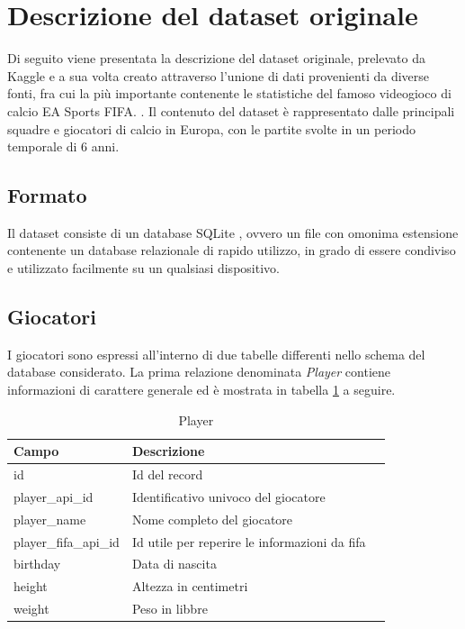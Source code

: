 \documentclass[hidelinks, 12pt]{article}
\begin{document}
\clearpage



\section{Descrizione del dataset originale}

Di seguito viene presentata la descrizione del dataset originale, prelevato da Kaggle \cite{site:kaggle-dataset} e a sua volta creato attraverso l'unione di dati provenienti da diverse fonti, fra cui la più importante contenente le statistiche del famoso videogioco di calcio EA Sports FIFA. \cite{site:ea-fifa}. Il contenuto del dataset è rappresentato dalle principali squadre e giocatori di calcio in Europa, con le partite svolte in un periodo temporale di 6 anni.



\subsection{Formato}

Il dataset consiste di un database SQLite \cite{site:sqlite}, ovvero un file con omonima estensione contenente un database relazionale di rapido utilizzo, in grado di essere condiviso e utilizzato facilmente su un qualsiasi dispositivo.



\subsection{Giocatori}

I giocatori sono espressi all'interno di due tabelle differenti nello schema del database considerato. La prima relazione denominata {\it Player} contiene informazioni di carattere generale ed è mostrata in tabella \ref{tab:player} a seguire.

\begin{table}[H]
	\caption{Player}\label{tab:player}
	\centering
	\begin{tabular}{|l|l|l|}
		\hline
		Campo & Descrizione \\
		\hline
		id & Id del record \\
		player\_api\_id & Identificativo univoco del giocatore \\
		player\_name & Nome completo del giocatore \\
		player\_fifa\_api\_id & Id utile per reperire le informazioni da fifa \\
		birthday & Data di nascita \\
		height & Altezza in centimetri \\
		weight & Peso in libbre \\
		\hline
	\end{tabular}
\end{table}
\end{document}
